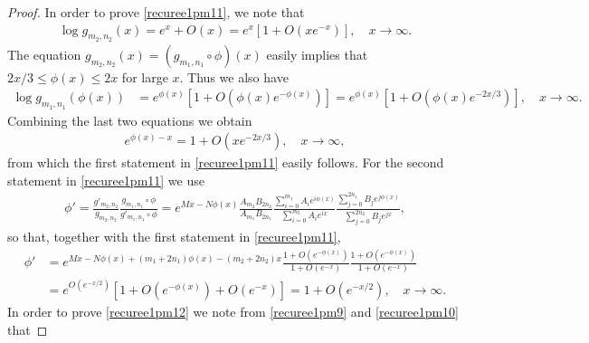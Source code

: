 \documentclass[10pt,a4paper]{amsart}
\begin{document}
\begin{proof}
In order to prove \eqref{recuree1pm11}, we note that
\begin{equation*}%
\begin{split}
\log g_{m_2,n_2}(x)=e^{x}+O(x)=e^{x}\left[1+O(xe^{-x})\right], \quad x\to \infty.
\end{split}
\end{equation*}
The equation $g_{m_2,n_2}(x)=(g_{m_1,n_1}\circ\phi)(x)$ easily implies that $2x/3\leq \phi(x)\leq 2x$ for large $x$. Thus we also have
\begin{equation*}%
\begin{split}
\log g_{m_1,n_1}(\phi(x))&=e^{\phi(x)}\left[1+O(\phi(x)e^{-\phi(x)})\right]=e^{\phi(x)}\left[1+O(\phi(x)e^{-2x/3})\right], \quad x\to \infty.
\end{split}
\end{equation*}
Combining the last two equations we obtain
\begin{equation*}%
\begin{split}
e^{\phi(x)-x}=1+O(xe^{-2x/3}), \quad x\to \infty,
\end{split}
\end{equation*}
from which the first statement in \eqref{recuree1pm11} easily follows. For the second statement in \eqref{recuree1pm11} we use
\begin{equation}\label{recuree1pm16  bef0}
\begin{split}
\phi'=\frac{g'_{m_2,n_2}}{g_{m_2,n_2}}\frac{g_{m_1,n_1}\circ\phi}{g'_{m_1,n_1}\circ\phi}=e^{Mx-N\phi(x)}\frac{A_{m_2}B_{2n_2}}{A_{m_1}B_{2n_1}}\frac{\sum_{i=0}^{m_1}A_ie^{i\phi(x)}}{\sum_{i=0}^{m_2}A_ie^{ix}}\frac{\sum_{j=0}^{2n_1}B_je^{j\phi(x)}}{\sum_{j=0}^{2n_2}B_je^{jx}},
\end{split}
\end{equation}
so that, together with the first statement in \eqref{recuree1pm11},
\begin{equation}\label{recuree1pm17 bef1}
\begin{split}
\phi'&=e^{Mx-N\phi(x)+(m_1+2n_1)\phi(x)-(m_2+2n_2)x}\frac{1+O(e^{-\phi(x)})}{1+O(e^{-x})}\frac{1+O(e^{-\phi(x)})}{1+O(e^{-x})}\\
&=e^{O(e^{-x/2})}\left[1+O(e^{-\phi(x)})+O(e^{-x})\right]=1+O(e^{-x/2}), \quad x\to \infty.
\end{split}
\end{equation}
In order to prove \eqref{recuree1pm12} we note from \eqref{recuree1pm9} and \eqref{recuree1pm10} that

\end{proof}
\end{document}
